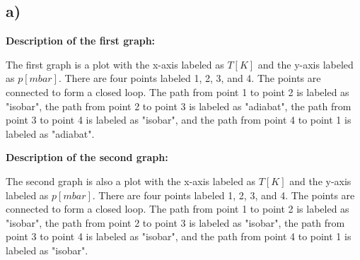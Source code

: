 

\subsection*{a)}

\textbf{Description of the first graph:} 

The first graph is a plot with the x-axis labeled as \( T [K] \) and the y-axis labeled as \( p [mbar] \). There are four points labeled 1, 2, 3, and 4. The points are connected to form a closed loop. The path from point 1 to point 2 is labeled as "isobar", the path from point 2 to point 3 is labeled as "adiabat", the path from point 3 to point 4 is labeled as "isobar", and the path from point 4 to point 1 is labeled as "adiabat".

\textbf{Description of the second graph:} 

The second graph is also a plot with the x-axis labeled as \( T [K] \) and the y-axis labeled as \( p [mbar] \). There are four points labeled 1, 2, 3, and 4. The points are connected to form a closed loop. The path from point 1 to point 2 is labeled as "isobar", the path from point 2 to point 3 is labeled as "isobar", the path from point 3 to point 4 is labeled as "isobar", and the path from point 4 to point 1 is labeled as "isobar".